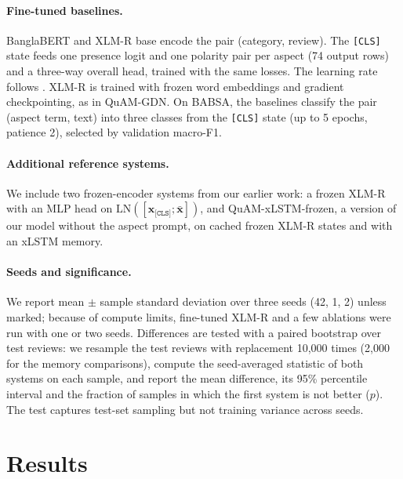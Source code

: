 \documentclass[11pt]{article}
\newcommand{\quam}{QuAM-GDN}
\begin{document}
\paragraph{Fine-tuned baselines.} BanglaBERT and XLM-R base encode the pair (category, review). The
\texttt{[CLS]} state feeds one presence logit and one polarity pair per aspect (74 output rows) and a
three-way overall head, trained with the same losses. The learning rate follows
\citet{haque2026ecomreviews}. XLM-R is trained with frozen word embeddings and gradient checkpointing,
as in \quam{}. On BABSA, the baselines classify the pair (aspect term, text) into three classes from the
\texttt{[CLS]} state (up to 5 epochs, patience 2), selected by validation macro-F1.

\paragraph{Additional reference systems.} We include two frozen-encoder systems from our earlier work:
a frozen XLM-R with an MLP head on $\mathrm{LN}([\mathbf{x}_{\texttt{[CLS]}};\bar{\mathbf{x}}])$, and
QuAM-xLSTM-frozen, a version of our model without the aspect prompt, on cached frozen XLM-R states and
with an xLSTM memory.

\paragraph{Seeds and significance.} We report mean $\pm$ sample standard deviation over three seeds
(42, 1, 2) unless marked; because of compute limits, fine-tuned XLM-R and a few ablations were run with
one or two seeds. Differences are tested with a paired bootstrap over test reviews: we resample the test
reviews with replacement 10,000 times (2,000 for the memory comparisons), compute the seed-averaged
statistic of both systems on each sample, and report the mean difference, its 95\% percentile interval
and the fraction of samples in which the first system is not better ($p$). The test captures test-set
sampling but not training variance across seeds.

\section{Results}
\label{sec:results}
\end{document}
